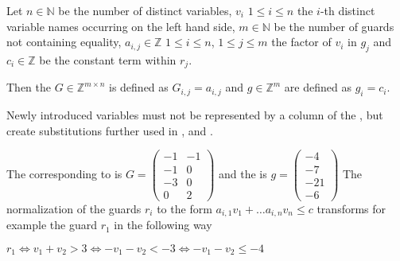 \begin{definition}
	\label{def:guard}
	Let $n \in \mathbb{N}$ be the number of distinct variables, $v_i$ $1 \le i \le n$ the $i$-th distinct variable names occurring on the left hand side, $m \in \mathbb{N}$ be the number of guards not containing equality, $a_{i,j} \in \mathbb{Z}$ $1\le i \le n$, $1 \le j \le m$ the factor of $v_i$ in $g_j$ and $c_i \in \mathbb{Z}$ be the constant term within $r_j$. \newline
	
	Then the \guardmatrix $G \in \mathbb{Z}^{m\times n}$ is defined as $G_{i,j}=a_{i,j} $ and \guardconstants $g \in \mathbb{Z}^m$ are defined as $g_i = c_i$.
	
	Newly introduced variables must not be represented by a column of the \guardmatrix, but create substitutions further used in ,  and .
\end{definition}
\begin{example}
	The corresponding \guardmatrix to  is $G = \begin{pmatrix} -1 & -1 \\ -1 & 0 \\ -3 & 0 \\ 0 & 2 \end{pmatrix}$ and the \guardconstants is $g= \begin{pmatrix} -4 \\ -7 \\ -21 \\ -6 \end{pmatrix}$ \newline
	The normalization of the guards $r_i$ to the form $a_{i,1}v_1+\dots a_{i,n}v_n \le c$ transforms for example the guard $r_1$ in the following way
	\begin{center}
		$r_1 \Leftrightarrow v_1+v_2 > 3  \Leftrightarrow -v_1-v_2 < -3 \Leftrightarrow -v_1-v_2 \le -4$
	\end{center}
\end{example}

